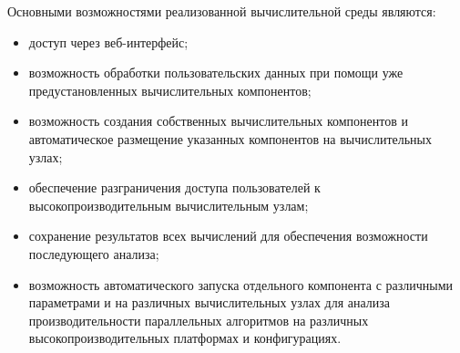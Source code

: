Основными возможностями реализованной вычислительной среды являются:
\begin{itemize}
  \item доступ через веб-интерфейс;
  \item возможность обработки пользовательских данных при помощи уже предустановленных вычислительных компонентов;
  \item возможность создания собственных вычислительных компонентов и автоматическое размещение указанных компонентов на вычислительных узлах;
  \item обеспечение разграничения доступа пользователей к высокопроизводительным вычислительным узлам;
  \item сохранение результатов всех вычислений для обеспечения возможности последующего анализа;
  \item возможность автоматического запуска отдельного компонента с различными параметрами и на различных вычислительных узлах для анализа производительности параллельных алгоритмов на различных высокопроизводительных платформах и конфигурациях.
\end{itemize}
